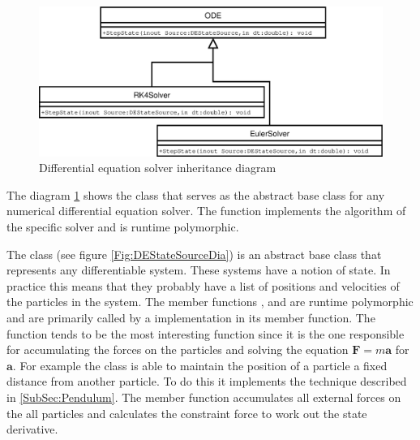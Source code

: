 \begin{figure}    
    \centering
    \includegraphics[width=0.8\textheight]{DESolver}    
    \caption{\label{Fig:DESolverInheritance}Differential equation solver inheritance diagram}
\end{figure}

The diagram \ref{Fig:DESolverInheritance} shows the  class that serves as the
abstract base class for any numerical differential equation solver. The function
 implements the algorithm of the specific solver and is
runtime polymorphic. 

The class  (see figure \ref{Fig:DEStateSourceDia}) is
an abstract base class that represents any differentiable system. These systems have a
notion of state. In practice this means that they probably have a list of
positions and velocities of the particles in the system. 
The member functions ,
 and  are runtime polymorphic and are primarily called
by a  implementation in its  member
function. The function  tends to be the most
interesting function since it is the one responsible for accumulating the
forces on the particles and solving the equation $\mathbf{F} = m\mathbf{a}$ for
$\mathbf{a}$. For example the class  is able to
maintain the position of a particle a fixed distance from another particle. To
do this it implements the technique described in \ref{SubSec:Pendulum}. The
member function  accumulates all external forces on the
all particles and calculates the constraint force to work out the state
derivative.  

